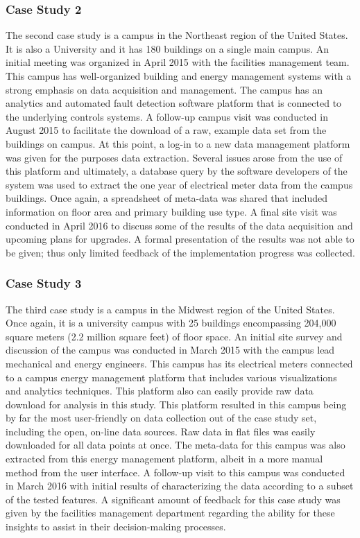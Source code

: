\subsubsection{Case Study 2}
\label{casestudy2}
The second case study is a campus in the Northeast region of the United States. It is also a University and it has 180 buildings on a single main campus. An initial meeting was organized in April 2015 with the facilities management team. This campus has well-organized building and energy management systems with a strong emphasis on data acquisition and management. The campus has an analytics and automated fault detection software platform that is connected to the underlying controls systems. A follow-up campus visit was conducted in August 2015 to facilitate the download of a raw, example data set from the buildings on campus. At this point, a log-in to a new data management platform was given for the purposes data extraction. Several issues arose from the use of this platform and ultimately, a database query by the software developers of the system was used to extract the one year of electrical meter data from the campus buildings. Once again, a spreadsheet of meta-data was shared that included information on floor area and primary building use type. A final site visit was conducted in April 2016 to discuss some of the results of the data acquisition and upcoming plans for upgrades. A formal presentation of the results was not able to be given; thus only limited feedback of the implementation progress was collected.

\subsubsection{Case Study 3}
\label{sec:casestudy3}

The third case study is a campus in the Midwest region of the United States. Once again, it is a university campus with 25 buildings encompassing 204,000 square meters (2.2 million square feet) of floor space. An initial site survey and discussion of the campus was conducted in March 2015 with the campus lead mechanical and energy engineers. This campus has its electrical meters connected to a campus energy management platform that includes various visualizations and analytics techniques. This platform also can easily provide raw data download for analysis in this study. This platform resulted in this campus being by far the most user-friendly on data collection out of the case study set, including the open, on-line data sources. Raw data in flat files was easily downloaded for all data points at once. The meta-data for this campus was also extracted from this energy management platform, albeit in a more manual method from the user interface. A follow-up visit to this campus was conducted in March 2016 with initial results of characterizing the data according to a subset of the tested features. A significant amount of feedback for this case study was given by the facilities management department regarding the ability for these insights to assist in their decision-making processes. 


